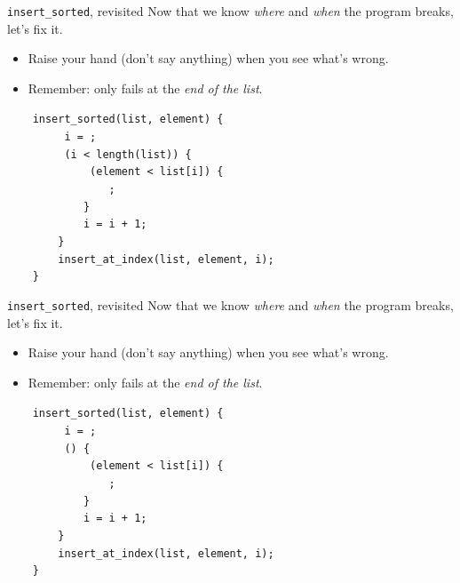 \documentclass[xcolor=dvipsnames]{beamer}
\begin{document}
\begin{frame}{\texttt{insert\_sorted}, revisited}
	Now that we know {\em where} and {\em when} the program breaks, let's fix it.
	\begin{itemize}
		\item Raise your hand (don't say anything) when you see what's wrong.
		\item Remember: only fails at the {\em end of the list}.
	\end{itemize}

	\linegap
		\texttt{~~~~insert\_sorted(list,~element)~\{} \\
			\texttt{~~~~~~~~~i~=~;} \\
		\texttt{~~~~~~~~~(i~<~length(list))~\{} \\
		\texttt{~~~~~~~~~~~~~(element~<~list[i])~\{} \\
		\texttt{~~~~~~~~~~~~~~~~;} \\
		\texttt{~~~~~~~~~~~~\}} \\
		\texttt{~~~~~~~~~~~~i = i + 1;} \\
		\texttt{~~~~~~~~\}} \\
		\texttt{~~~~~~~~insert\_at\_index(list,~element,~i);} \\
		\texttt{~~~~\}} \\
\end{frame}
\begin{frame}{\texttt{insert\_sorted}, revisited}
	Now that we know {\em where} and {\em when} the program breaks, let's fix it.
	\begin{itemize}
		\item Raise your hand (don't say anything) when you see what's wrong.
		\item Remember: only fails at the {\em end of the list}.
	\end{itemize}

	\linegap
		\texttt{~~~~insert\_sorted(list,~element)~\{} \\
			\texttt{~~~~~~~~~i~=~;} \\
			\texttt{~~~~~~~~~()~\{~} \\
		\texttt{~~~~~~~~~~~~~(element~<~list[i])~\{} \\
		\texttt{~~~~~~~~~~~~~~~~;} \\
		\texttt{~~~~~~~~~~~~\}} \\
		\texttt{~~~~~~~~~~~~i = i + 1;} \\
		\texttt{~~~~~~~~\}} \\
		\texttt{~~~~~~~~insert\_at\_index(list,~element,~i);} \\
		\texttt{~~~~\}} \\
\end{frame}
\end{document}
